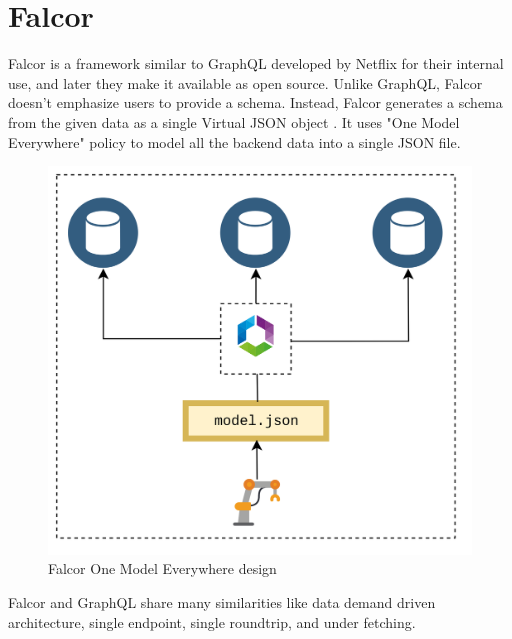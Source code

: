 	\section{Falcor}
	Falcor is a framework similar to GraphQL developed by Netflix for their internal use, and later they make it available as open source. Unlike GraphQL, Falcor doesn't emphasize users to provide a schema. Instead, Falcor generates a schema from the given data as a single Virtual JSON object \cite{misc03}. It uses "One Model Everywhere" \cite{misc03} policy to model all the backend data into a single JSON file.
	
	\begin{figure}[!htbp] 
		\begin{center}
			\includegraphics[trim={0 0 0 2cm},clip,scale=0.09]{./images/png/one_model_everywhere}	
			\caption{ Falcor One Model Everywhere design \cite{misc03} }	
			\label{fig:one_model_everywhere}	
		\end{center}
	\end{figure}
	Falcor and GraphQL share many similarities like data demand driven architecture, single endpoint, single roundtrip, and under fetching.
	
